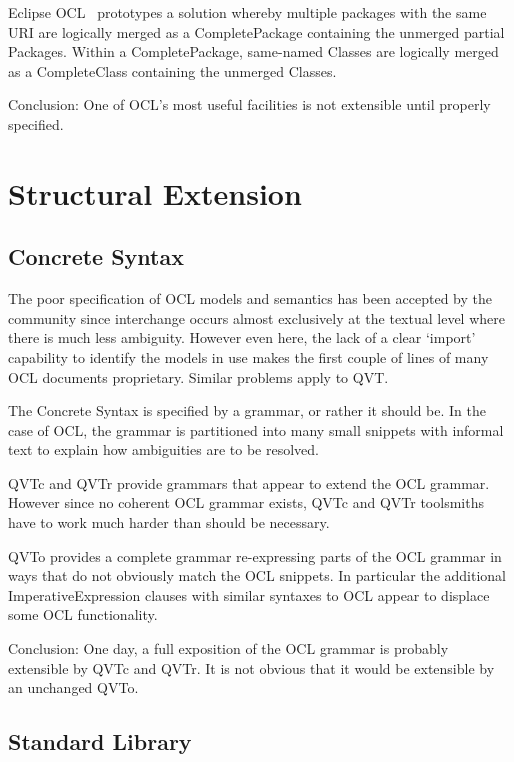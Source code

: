 \documentclass{llncs}
\begin{document}
Eclipse OCL~\cite{Eclipse-OCL} prototypes a solution whereby multiple packages with the same URI are logically merged as a CompletePackage containing the unmerged partial Packages. Within a CompletePackage, same-named Classes are logically merged as a CompleteClass containing the unmerged Classes.

Conclusion: One of OCL's most useful facilities is not extensible until properly specified.

\section{Structural Extension}\label{Structural Extension}

\subsection{Concrete Syntax}\label{Concrete Syntax}

The poor specification of OCL models and semantics has been accepted by the community since interchange occurs almost exclusively at the textual level where there is much less ambiguity. However even here, the lack of a clear `import' capability to identify the models in use makes the first couple of lines of many OCL documents proprietary. Similar problems apply to QVT.

The Concrete Syntax is specified by a grammar, or rather it should be. In the case of OCL, the grammar is partitioned into many small snippets with informal text to explain how ambiguities are to be resolved.

QVTc and QVTr provide grammars that appear to extend the OCL grammar. However since no coherent OCL grammar exists, QVTc and QVTr toolsmiths have to work much harder than should be necessary.

QVTo provides a complete grammar re-expressing parts of the OCL grammar in ways that do not obviously match the OCL snippets. In particular the additional ImperativeExpression clauses with similar syntaxes to OCL appear to displace some OCL functionality.

Conclusion: One day, a full exposition of the OCL grammar is probably extensible by QVTc and QVTr. It is not obvious that it would be extensible by an unchanged QVTo. 

\subsection{Standard Library}\label{Standard Library}
\end{document}
